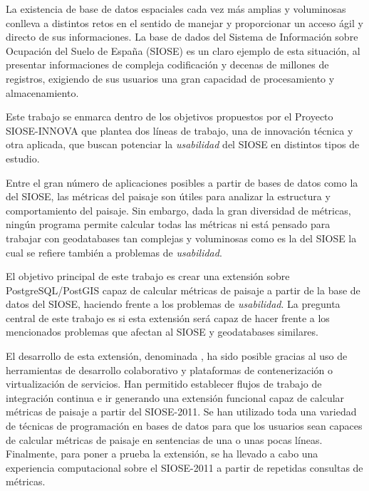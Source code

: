 
\begin{resumen}

La existencia de base de datos espaciales cada vez más amplias y voluminosas conlleva a distintos retos en el sentido de manejar y proporcionar un acceso ágil y directo de sus informaciones. La base de dados del Sistema de Información sobre Ocupación del Suelo de España (SIOSE) es un claro ejemplo de esta situación, al presentar informaciones de compleja codificación y decenas de millones de registros, exigiendo de sus usuarios una gran capacidad de procesamiento y almacenamiento.

Este trabajo se enmarca dentro de los objetivos propuestos por el Proyecto SIOSE-INNOVA que plantea dos líneas de trabajo, una de innovación técnica y otra aplicada, que buscan potenciar la \textit{usabilidad} del SIOSE en distintos tipos de estudio.

Entre el gran número de aplicaciones posibles a partir de bases de datos como la del SIOSE, las métricas del paisaje son útiles para analizar la estructura y comportamiento del paisaje. Sin embargo, dada la gran diversidad de métricas, ningún programa permite calcular todas las métricas ni está pensado para trabajar con geodatabases tan complejas y voluminosas como es la del SIOSE la cual se refiere también a problemas de \textit{usabilidad}.
 
El objetivo principal de este trabajo es crear una extensión sobre PostgreSQL/PostGIS capaz de calcular métricas de paisaje a partir de la base de datos del SIOSE, haciendo frente a los problemas de \textit{usabilidad}. La pregunta central de este trabajo es si esta extensión será capaz de hacer frente a los mencionados problemas que afectan al SIOSE y geodatabases similares. 

El desarrollo de esta extensión, denominada \pgland{}, ha sido posible gracias al uso de herramientas de desarrollo colaborativo y plataformas de contenerización o virtualización de servicios. Han permitido establecer flujos de trabajo de integración continua e ir generando una extensión funcional capaz de calcular métricas de paisaje a partir del SIOSE-2011. Se han utilizado toda una variedad de técnicas de programación en bases de datos para que los usuarios sean capaces de calcular métricas de paisaje en sentencias de una o unas pocas líneas. Finalmente, para poner a prueba la extensión, se ha llevado a cabo una experiencia computacional sobre el SIOSE-2011 a partir de repetidas consultas de métricas. 


\end{resumen}
